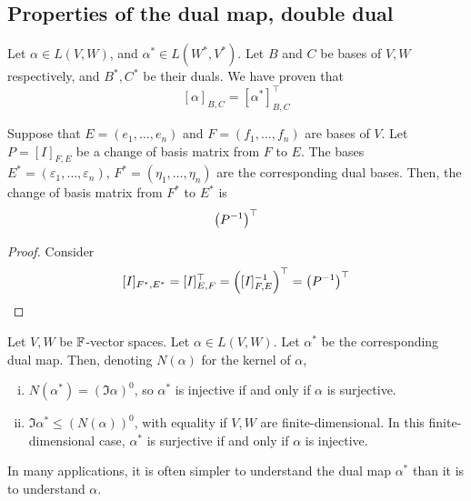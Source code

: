 \documentclass[a4paper]{article}
\begin{document}
\subsection{Properties of the dual map, double dual}

Let \( \alpha \in L(V,W) \), and \( \alpha^* \in L(W^*, V^*) \).
Let \( B \) and \( C \) be bases of \( V, W \) respectively, and \( B^*, C^* \) be their duals.
We have proven that
\[
	[\alpha]_{B,C} = [\alpha^*]^\top_{B,C}
\]
\begin{lemma}
	Suppose that \( E = (e_1, \dots, e_n) \) and \( F = (f_1, \dots, f_n) \) are bases of \( V \).
	Let \( P = [I]_{F, E} \) be a change of basis matrix from \( F \) to \( E \).
	The bases \( E^* = (\varepsilon_1, \dots, \varepsilon_n) \), \( F^* = (\eta_1, \dots, \eta_n) \) are the corresponding dual bases.
	Then, the change of basis matrix from \( F^* \) to \( E^* \) is
	\[
		\qty(P^{-1})^\top
	\]
\end{lemma}
\begin{proof}
	Consider
	\[
		[I]_{F^*, E^*} = [I]^\top_{E, F} = \qty([I]_{F, E}^{-1})^\top = \qty(P^{-1})^\top
	\]
\end{proof}
\begin{lemma}
	Let \( V, W \) be \( {\mathbb{F}} \)-vector spaces.
	Let \( \alpha \in L(V, W) \).
	Let \( \alpha^* \) be the corresponding dual map.
	Then, denoting \( N(\alpha) \) for the kernel of \( \alpha \),
	\begin{enumerate}[(i)]
		\item \( N(\alpha^*) = (\Im \alpha)^0 \), so \( \alpha^* \) is injective if and only if \( \alpha \) is surjective.
		\item \( \Im \alpha^* \leq (N(\alpha))^0 \), with equality if \( V, W \) are finite-dimensional.
		      In this finite-dimensional case, \( \alpha^* \) is surjective if and only if \( \alpha \) is injective.
	\end{enumerate}
\end{lemma}
\begin{remark}
	In many applications, it is often simpler to understand the dual map \( \alpha^* \) than it is to understand \( \alpha \).
\end{remark}
\end{document}
